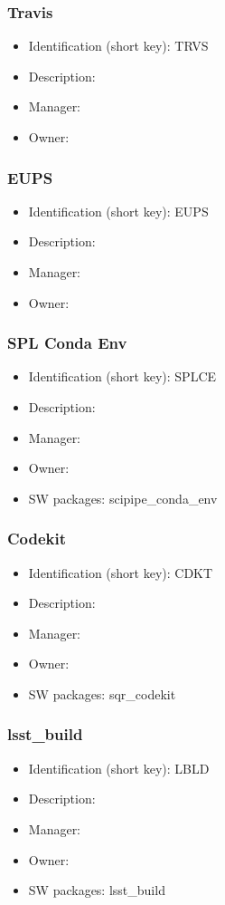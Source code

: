 \subsubsection{Travis}\label{sect:TRVS}
\begin{itemize}
\item Identification (short key): TRVS
\item Description: 
\item Manager: 
\item Owner: 
\end{itemize}

\subsubsection{EUPS}\label{sect:EUPS}
\begin{itemize}
\item Identification (short key): EUPS
\item Description: 
\item Manager: 
\item Owner: 
\end{itemize}

\subsubsection{SPL Conda Env}\label{sect:SPLCE}
\begin{itemize}
\item Identification (short key): SPLCE
\item Description: 
\item Manager: 
\item Owner: 
\item SW packages: scipipe\_conda\_env
\end{itemize}

\subsubsection{Codekit}\label{sect:CDKT}
\begin{itemize}
\item Identification (short key): CDKT
\item Description: 
\item Manager: 
\item Owner: 
\item SW packages: sqr\_codekit
\end{itemize}

\subsubsection{lsst\_build}\label{sect:LBLD}
\begin{itemize}
\item Identification (short key): LBLD
\item Description: 
\item Manager: 
\item Owner: 
\item SW packages: lsst\_build
\end{itemize}

